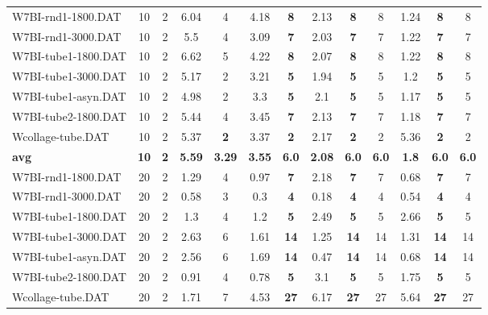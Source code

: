 \begin{table}[h]
{\begin{tabular}{lcccccccccccc}
W7BI-rnd1-1800.DAT & 10 & 2 & 6.04 & 4 & 4.18 &  \textbf{8} & 2.13 &  \textbf{8} & 8 &  \textcolor{blue2}{1.24} &  \textbf{8} & 8 \\
W7BI-rnd1-3000.DAT & 10 & 2 & 5.5 & 4 & 3.09 &  \textbf{7} & 2.03 &  \textbf{7} & 7 &  \textcolor{blue2}{1.22} &  \textbf{7} & 7 \\
W7BI-tube1-1800.DAT & 10 & 2 & 6.62 & 5 & 4.22 &  \textbf{8} & 2.07 &  \textbf{8} & 8 &  \textcolor{blue2}{1.22} &  \textbf{8} & 8 \\
W7BI-tube1-3000.DAT & 10 & 2 & 5.17 & 2 & 3.21 &  \textbf{5} & 1.94 &  \textbf{5} & 5 &  \textcolor{blue2}{1.2} &  \textbf{5} & 5 \\
W7BI-tube1-asyn.DAT & 10 & 2 & 4.98 & 2 & 3.3 &  \textbf{5} & 2.1 &  \textbf{5} & 5 &  \textcolor{blue2}{1.17} &  \textbf{5} & 5 \\
W7BI-tube2-1800.DAT & 10 & 2 & 5.44 & 4 & 3.45 &  \textbf{7} & 2.13 &  \textbf{7} & 7 &  \textcolor{blue2}{1.18} &  \textbf{7} & 7 \\
Wcollage-tube.DAT & 10 & 2 & 5.37 &  \textbf{2} & 3.37 &  \textbf{2} &  \textcolor{blue2}{2.17} &  \textbf{2} & 2 & 5.36 &  \textbf{2} & 2 \\
\cline{1-13} \textbf{avg} & \textbf{10} & \textbf{2} & \textbf{5.59} & \textbf{3.29} & \textbf{3.55} & \textbf{6.0} & \textbf{2.08} & \textbf{6.0} & \textbf{6.0} & \textbf{1.8} & \textbf{6.0} & \textbf{6.0} \\ \cline{1-13}
W7BI-rnd1-1800.DAT & 20 & 2 & 1.29 & 4 & 0.97 &  \textbf{7} & 2.18 &  \textbf{7} & 7 &  \textcolor{blue2}{0.68} &  \textbf{7} & 7 \\
W7BI-rnd1-3000.DAT & 20 & 2 & 0.58 & 3 & 0.3 &  \textbf{4} &  \textcolor{blue2}{0.18} &  \textbf{4} & 4 & 0.54 &  \textbf{4} & 4 \\
W7BI-tube1-1800.DAT & 20 & 2 & 1.3 & 4 &  \textcolor{blue2}{1.2} &  \textbf{5} & 2.49 &  \textbf{5} & 5 & 2.66 &  \textbf{5} & 5 \\
W7BI-tube1-3000.DAT & 20 & 2 & 2.63 & 6 & 1.61 &  \textbf{14} &  \textcolor{blue2}{1.25} &  \textbf{14} & 14 & 1.31 &  \textbf{14} & 14 \\
W7BI-tube1-asyn.DAT & 20 & 2 & 2.56 & 6 & 1.69 &  \textbf{14} &  \textcolor{blue2}{0.47} &  \textbf{14} & 14 & 0.68 &  \textbf{14} & 14 \\
W7BI-tube2-1800.DAT & 20 & 2 & 0.91 & 4 &  \textcolor{blue2}{0.78} &  \textbf{5} & 3.1 &  \textbf{5} & 5 & 1.75 &  \textbf{5} & 5 \\
Wcollage-tube.DAT & 20 & 2 &  \textcolor{blue2}{1.71} & 7 & 4.53 &  \textbf{27} & 6.17 &  \textbf{27} & 27 & 5.64 &  \textbf{27} & 27 \\

\end{tabular}}
\end{table}
